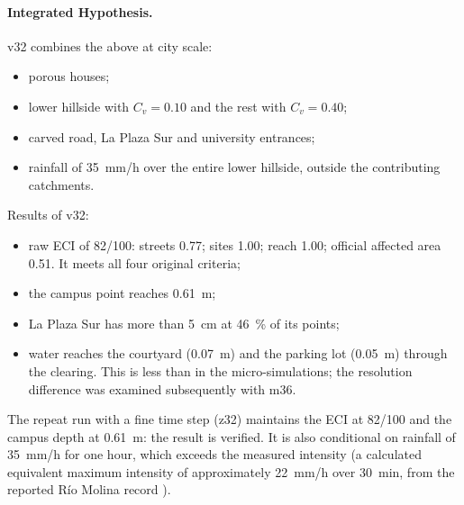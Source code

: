 \paragraph{Integrated Hypothesis.} v32 combines the above at city scale:
\begin{itemize}
\item porous houses;
\item lower hillside with $C_v=0.10$ and the rest with $C_v=0.40$;
\item carved road, La Plaza Sur and university entrances;
\item rainfall of \SI{35}{mm/h} over the entire lower hillside, outside the contributing catchments.
\end{itemize}
Results of v32:
\begin{itemize}
\item raw ECI of 82/100: streets 0.77; sites 1.00; reach 1.00; official affected area 0.51. It meets all four original criteria;
\item the campus point reaches \SI{0.61}{m};
\item La Plaza Sur has more than \SI{5}{cm} at \SI{46}{\percent} of its points;
\item water reaches the courtyard (\SI{0.07}{m}) and the parking lot (\SI{0.05}{m}) through the clearing. This is less than in the micro-simulations; the resolution difference was examined subsequently with m36.
\end{itemize}
The repeat run with a fine time step (z32) maintains the ECI at 82/100 and the campus depth at \SI{0.61}{m}: the result is verified. It is also conditional on rainfall of \SI{35}{mm/h} for one hour, which exceeds the measured intensity (a calculated equivalent maximum intensity of approximately \SI{22}{mm/h} over \SI{30}{min}, from the reported Río Molina record \citep{cr2_2026}).

